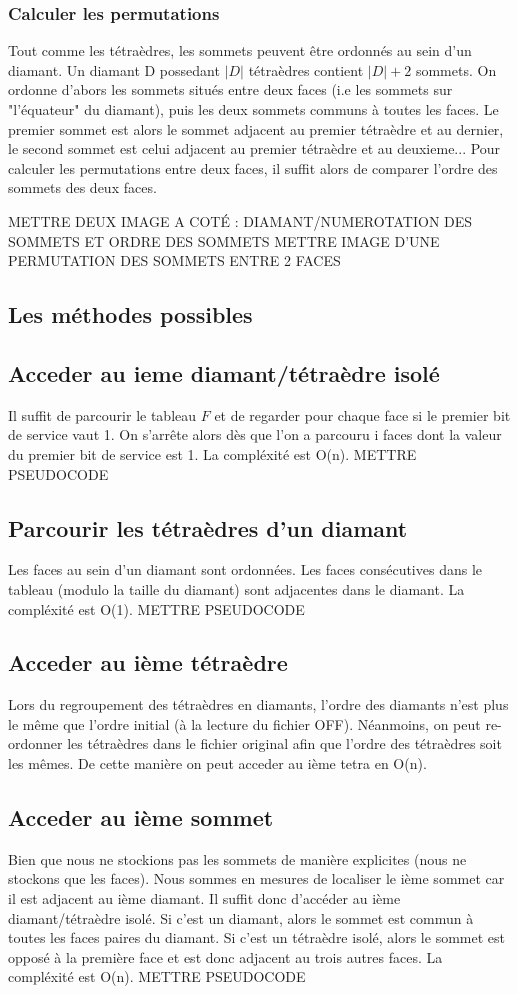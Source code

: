 \documentclass[a4paper,11pt,openany]{article}
\begin{document}
\subsubsection{Calculer les permutations}
\noindent
Tout comme les tétraèdres, les sommets peuvent être ordonnés au sein d'un diamant. Un diamant D possedant $|D|$ tétraèdres contient $|D|+2$ sommets. On ordonne d'abors les sommets situés entre deux faces (i.e les sommets sur "l'équateur" du diamant), puis les deux sommets communs à toutes les faces. Le premier sommet est alors le sommet adjacent au premier tétraèdre et au dernier, le second sommet est celui adjacent au premier tétraèdre et au deuxieme... Pour calculer les permutations entre deux faces, il suffit alors de comparer l'ordre des sommets des deux faces.

METTRE DEUX IMAGE A COTÉ : DIAMANT/NUMEROTATION DES SOMMETS ET ORDRE DES SOMMETS
METTRE IMAGE D'UNE PERMUTATION DES SOMMETS ENTRE 2 FACES
\subsection{Les méthodes possibles}
\subsection{Acceder au ieme diamant/tétraèdre isolé}
Il suffit de parcourir le tableau $F$ et de regarder pour chaque face si le premier bit de service vaut 1. On s'arrête alors dès que l'on a parcouru i faces dont la valeur du premier bit de service est 1. La compléxité est O(n).
METTRE PSEUDOCODE
\subsection{Parcourir les tétraèdres d'un diamant}
Les faces au sein d'un diamant sont ordonnées. Les faces consécutives dans le tableau (modulo la taille du diamant) sont adjacentes dans le diamant. La compléxité est O(1).
METTRE PSEUDOCODE
\subsection{Acceder au ième tétraèdre}
Lors du regroupement des tétraèdres en diamants, l'ordre des diamants n'est plus le même que l'ordre initial (à la lecture du fichier OFF). Néanmoins, on peut re-ordonner les tétraèdres dans le fichier original afin que l'ordre des tétraèdres soit les mêmes. De cette manière on peut acceder au ième tetra en O(n).
\subsection{Acceder au ième sommet}
Bien que nous ne stockions pas les sommets de manière explicites (nous ne stockons que les faces). Nous sommes en mesures de localiser le ième sommet car il est adjacent au ième diamant.
Il suffit donc d'accéder au ième diamant/tétraèdre isolé. Si c'est un diamant, alors le sommet est commun à toutes les faces paires du diamant. Si c'est un tétraèdre isolé, alors le sommet est opposé à la première face et est donc adjacent au trois autres faces. La compléxité est O(n).
METTRE PSEUDOCODE
\end{document}
